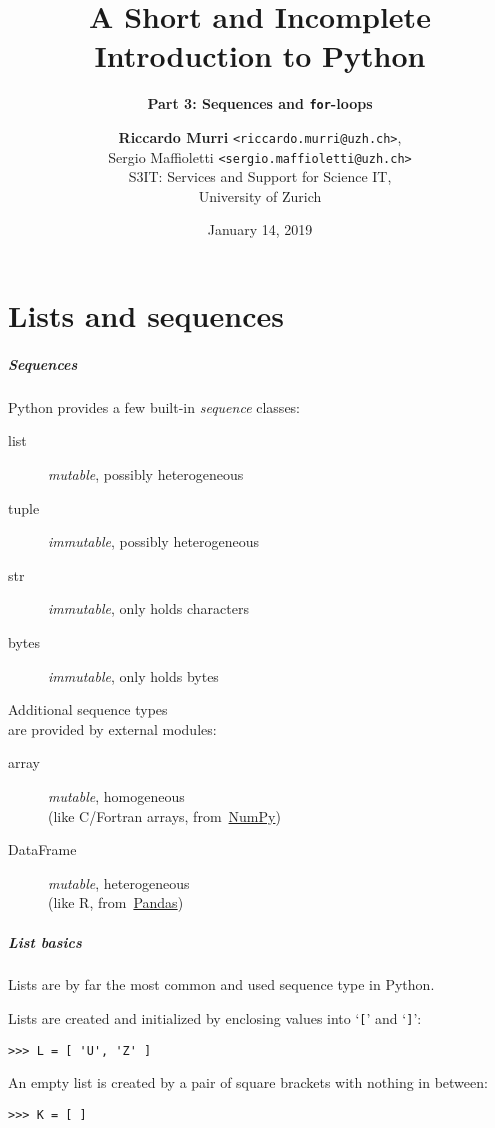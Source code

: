 \documentclass[english,serif,mathserif,xcolor=pdftex,dvipsnames,table]{beamer}
\title[3. Sequences and loops]{%
  A Short and Incomplete Introduction to Python
}
\subtitle{\bfseries Part 3: Sequences and \texttt{for}-loops}
\author[R.~Murri]{%
  \textbf{Riccardo Murri} \texttt{<riccardo.murri@uzh.ch>}, \\
  Sergio Maffioletti \texttt{<sergio.maffioletti@uzh.ch>}
  \\
  S3IT: Services and Support for Science IT,
  \\
  University of Zurich
}
\date{January 14, 2019}
\begin{document}
\maketitle


\part{Lists and sequences}

\begin{frame}
  \frametitle{Sequences}

  Python provides a few built-in \emph{sequence} classes:
  \begin{description}
  \item[list] \emph{mutable}, possibly heterogeneous
  \item[tuple] \emph{immutable}, possibly heterogeneous
  \item[str] \emph{immutable}, only holds characters
  \item[bytes] \emph{immutable}, only holds bytes
  \end{description}

  \+
  Additional sequence types \\ are provided by external modules:
  \begin{description}
  \item[array] \emph{mutable}, homogeneous \\ (like C/Fortran arrays,
    from~\href{http://numpy.scipy.org}{NumPy})
  \item[DataFrame] \emph{mutable}, heterogeneous \\ (like R,
    from~\href{http://pandas.pydata.org/}{Pandas})
  \end{description}

\end{frame}


\begin{frame}[fragile]
  \frametitle{List basics}
  Lists are by far the most common and used sequence type in Python.

  \+
  Lists are created and initialized by enclosing values into
  `\texttt{[}' and `\texttt{]}':
\begin{lstlisting}
>>> L = [ 'U', 'Z' ]
\end{lstlisting}

  \+
  An empty list is created by a pair of square brackets with
  nothing in between:
\begin{lstlisting}
>>> K = [ ]
\end{lstlisting}

\end{frame}
\end{document}
